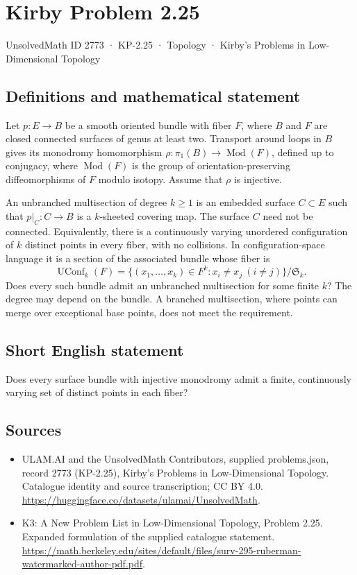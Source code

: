 \documentclass[11pt,a4paper]{article}
\begin{document}
\section*{Kirby Problem 2.25}\label{2773}
{\small UnsolvedMath ID 2773 · KP-2.25 · Topology · Kirby's Problems in Low-Dimensional Topology}
\subsection{Definitions and mathematical statement}
Let $p:E\to B$ be a smooth oriented bundle with fiber $F$, where $B$ and $F$
are closed connected surfaces of genus at least two. Transport around loops in
$B$ gives its monodromy homomorphism
$\rho:\pi_1(B)\to\operatorname{Mod}(F)$, defined up to conjugacy, where
$\operatorname{Mod}(F)$ is the group of orientation-preserving diffeomorphisms
of $F$ modulo isotopy. Assume that $\rho$ is injective.

An unbranched multisection of degree $k\geq1$ is an embedded surface
$C\subset E$ such that $p|_C:C\to B$ is a $k$-sheeted covering map. The surface
$C$ need not be connected. Equivalently, there is a continuously varying
unordered configuration of $k$ distinct points in every fiber, with no collisions.
In configuration-space language it is a section of the associated bundle
whose fiber is
\[
 \operatorname{UConf}_k(F)=
 \{(x_1,\ldots,x_k)\in F^k:x_i\ne x_j\ (i\ne j)\}/\mathfrak S_k.
\]
Does every such bundle admit an unbranched multisection for some finite $k$?
The degree may depend on the bundle. A branched multisection, where points can
merge over exceptional base points, does not meet the requirement.
\subsection{Short English statement}
Does every surface bundle with injective monodromy admit a finite, continuously varying set of distinct points in each fiber?
\subsection{Sources}
\begin{itemize}
\item[S1] ULAM.AI and the UnsolvedMath Contributors, supplied problems.json, record 2773 (KP-2.25), Kirby's Problems in Low-Dimensional Topology. Catalogue identity and source transcription; CC BY 4.0.
\url{https://huggingface.co/datasets/ulamai/UnsolvedMath}.
\item[S2] K3: A New Problem List in Low-Dimensional Topology, Problem 2.25. Expanded formulation of the supplied catalogue statement.
\url{https://math.berkeley.edu/sites/default/files/surv-295-ruberman-watermarked-author-pdf.pdf}.
\end{itemize}
\end{document}
